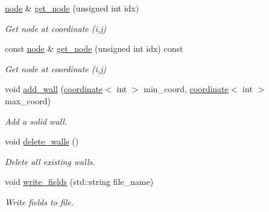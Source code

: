 \begin{DoxyCompactItemize}
\hyperlink{structlb_1_1node}{node} \& \hyperlink{classlb_1_1lattice_acbc4a30a7be4b9166fbceb8e49cc7b83}{get\-\_\-node} (unsigned int idx)
\begin{DoxyCompactList}\small\item\em \-Get node at coordinate (i,j) \end{DoxyCompactList}\item 
const \hyperlink{structlb_1_1node}{node} \& \hyperlink{classlb_1_1lattice_acbbd8fb970bc660338e16cdebfd04148}{get\-\_\-node} (unsigned int idx) const 
\begin{DoxyCompactList}\small\item\em \-Get node at coordinate (i,j) \end{DoxyCompactList}\item 
void \hyperlink{classlb_1_1lattice_aac41b17e5a623e6bdb7a72eadd5e7395}{add\-\_\-wall} (\hyperlink{structlb_1_1coordinate}{coordinate}$<$ int $>$ min\-\_\-coord, \hyperlink{structlb_1_1coordinate}{coordinate}$<$ int $>$ max\-\_\-coord)
\begin{DoxyCompactList}\small\item\em \-Add a solid wall. \end{DoxyCompactList}\item 
\hypertarget{classlb_1_1lattice_ab29487073b5dac24b0376265ef897a9f}{void \hyperlink{classlb_1_1lattice_ab29487073b5dac24b0376265ef897a9f}{delete\-\_\-walls} ()}\label{classlb_1_1lattice_ab29487073b5dac24b0376265ef897a9f}

\begin{DoxyCompactList}\small\item\em \-Delete all existing walls. \end{DoxyCompactList}\item 
void \hyperlink{classlb_1_1lattice_aa172ccb356a08e0c6980e1cb592a2505}{write\-\_\-fields} (std\-::string file\-\_\-name)
\begin{DoxyCompactList}\small\item\em \-Write fields to file. \end{DoxyCompactList}\end{DoxyCompactItemize}
